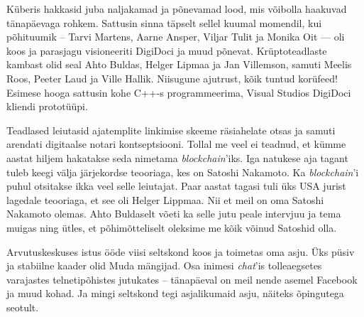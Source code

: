 Küberis hakkasid juba naljakamad ja põnevamad 
lood, mis võibolla haakuvad tänapäevaga rohkem. Sattusin 
sinna täpselt sellel kuumal momendil, kui põhituumik -- Tarvi 
Martens, Aarne Ansper, 
Viljar Tulit ja Monika Oit 
--- oli koos ja parasjagu visioneeriti DigiDoci ja muud põnevat. Krüptoteadlaste kambast olid seal Ahto 
Buldas, Helger Lipmaa ja Jan 
Villemson, samuti
Meelis Roos, Peeter Laud ja Ville Hallik. Niisugune ajutrust, kõik tuntud korüfeed! 
Esimese hooga sattusin kohe C++-s programmeerima, 
Visual Studios DigiDoci kliendi prototüüpi. 

Teadlased leiutasid ajatemplite linkimise skeeme 
räsiahelate otsas ja samuti arendati digitaalse notari kontseptsiooni. Tollal me veel ei teadnud, et kümme aastat hiljem 
hakatakse seda nimetama \emph{blockchain}'iks. Iga natukese aja tagant tuleb keegi 
välja järjekordse teooriaga, kes on Satoshi Nakamoto. Ka \emph{blockchain}'i puhul otsitakse ikka veel selle leiutajat. Paar aastat 
tagasi tuli üks USA jurist 
lagedale teooriaga, et see oli Helger Lippmaa. Nii et meil on oma 
Satoshi Nakamoto olemas. Ahto Buldaselt võeti ka 
selle jutu peale intervjuu ja tema muigas ning ütles, et põhimõtteliselt oleksime me kõik 
võinud Satoshid olla. 


Arvutuskeskuses istus ööde viisi seltskond koos 
ja toimetas oma asju. Üks püsiv ja stabiilne kaader olid 
Muda mängijad. Osa inimesi \emph{chat}'is 
tolleaegsetes varajastes telnetipõhistes jutukates -- 
tänapäeval on meil nende asemel Facebook ja muud kohad. Ja mingi seltskond tegi asjalikumaid asju, näiteks õpingutega seotult. 


